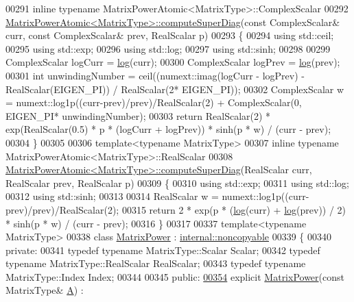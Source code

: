\begin{DoxyCode}
00291 \textcolor{keyword}{inline} \textcolor{keyword}{typename} MatrixPowerAtomic<MatrixType>::ComplexScalar
00292 \hyperlink{class_eigen_1_1_matrix_power_atomic}{MatrixPowerAtomic<MatrixType>::computeSuperDiag}(\textcolor{keyword}{const} 
      ComplexScalar& curr, \textcolor{keyword}{const} ComplexScalar& prev, RealScalar p)
00293 \{
00294   \textcolor{keyword}{using} std::ceil;
00295   \textcolor{keyword}{using} std::exp;
00296   \textcolor{keyword}{using} std::log;
00297   \textcolor{keyword}{using} std::sinh;
00298 
00299   ComplexScalar logCurr = \hyperlink{structlog}{log}(curr);
00300   ComplexScalar logPrev = \hyperlink{structlog}{log}(prev);
00301   \textcolor{keywordtype}{int} unwindingNumber = ceil((numext::imag(logCurr - logPrev) - RealScalar(EIGEN\_PI)) / RealScalar(2*
      EIGEN\_PI));
00302   ComplexScalar w = numext::log1p((curr-prev)/prev)/RealScalar(2) + ComplexScalar(0, EIGEN\_PI*
      unwindingNumber);
00303   \textcolor{keywordflow}{return} RealScalar(2) * exp(RealScalar(0.5) * p * (logCurr + logPrev)) * sinh(p * w) / (curr - prev);
00304 \}
00305 
00306 \textcolor{keyword}{template}<\textcolor{keyword}{typename} MatrixType>
00307 \textcolor{keyword}{inline} \textcolor{keyword}{typename} MatrixPowerAtomic<MatrixType>::RealScalar
00308 \hyperlink{class_eigen_1_1_matrix_power_atomic}{MatrixPowerAtomic<MatrixType>::computeSuperDiag}(RealScalar 
      curr, RealScalar prev, RealScalar p)
00309 \{
00310   \textcolor{keyword}{using} std::exp;
00311   \textcolor{keyword}{using} std::log;
00312   \textcolor{keyword}{using} std::sinh;
00313 
00314   RealScalar w = numext::log1p((curr-prev)/prev)/RealScalar(2);
00315   \textcolor{keywordflow}{return} 2 * exp(p * (\hyperlink{structlog}{log}(curr) + \hyperlink{structlog}{log}(prev)) / 2) * sinh(p * w) / (curr - prev);
00316 \}
00317 
00337 \textcolor{keyword}{template}<\textcolor{keyword}{typename} MatrixType>
00338 \textcolor{keyword}{class }\hyperlink{class_eigen_1_1_matrix_power}{MatrixPower} : \hyperlink{class_eigen_1_1internal_1_1noncopyable}{internal::noncopyable}
00339 \{
00340   \textcolor{keyword}{private}:
00341     \textcolor{keyword}{typedef} \textcolor{keyword}{typename} MatrixType::Scalar Scalar;
00342     \textcolor{keyword}{typedef} \textcolor{keyword}{typename} MatrixType::RealScalar RealScalar;
00343     \textcolor{keyword}{typedef} \textcolor{keyword}{typename} MatrixType::Index Index;
00344 
00345   \textcolor{keyword}{public}:
\hyperlink{class_eigen_1_1_matrix_power_a5eb445525601510413b53cd347c44716}{00354}     \textcolor{keyword}{explicit} \hyperlink{class_eigen_1_1_matrix_power_a5eb445525601510413b53cd347c44716}{MatrixPower}(\textcolor{keyword}{const} MatrixType& \hyperlink{group___core___module_class_eigen_1_1_matrix}{A}) :

\end{DoxyCode}

